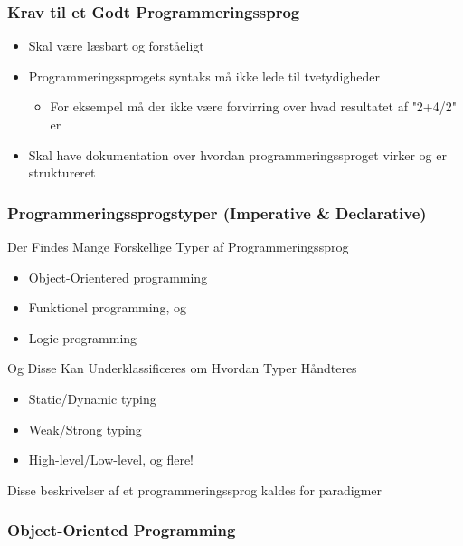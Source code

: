 \documentclass[12pt,t]{beamer}
\begin{document}
\begin{frame}
 \frametitle{Krav til et Godt Programmeringssprog}
 \begin{block}{}
  \begin{itemize}
  \item Skal være læsbart og forståeligt\\
  \item Programmeringssprogets syntaks må ikke lede til tvetydigheder
  \begin{itemize} 
  \item For eksempel må der ikke være forvirring over hvad resultatet af "2+4/2" er
  \end{itemize}
  \item Skal have dokumentation over hvordan programmeringssproget virker og er 
  struktureret
  \end{itemize}
 \end{block}
\end{frame}

\begin{frame}
 \frametitle{Programmeringssprogstyper {\tiny (Imperative \& Declarative)}}
 \begin{block}{Der Findes Mange Forskellige Typer af Programmeringssprog}
 \begin{itemize}
  \item Object-Orientered programming
  \item Funktionel programming, og
  \item Logic programming
 \end{itemize}
 \end{block}
 \begin{exampleblock}{Og Disse Kan Underklassificeres om Hvordan Typer Håndteres}
 \begin{itemize}
 \item Static/Dynamic typing
 \item Weak/Strong typing
 \item High-level/Low-level, og flere!
 \end{itemize}
 \end{exampleblock}
 Disse beskrivelser af et programmeringssprog kaldes for paradigmer
\end{frame}

\begin{frame}
\frametitle{Object-Oriented Programming}
\begin{block}{}
\end{block}
\end{frame}
\end{document}
